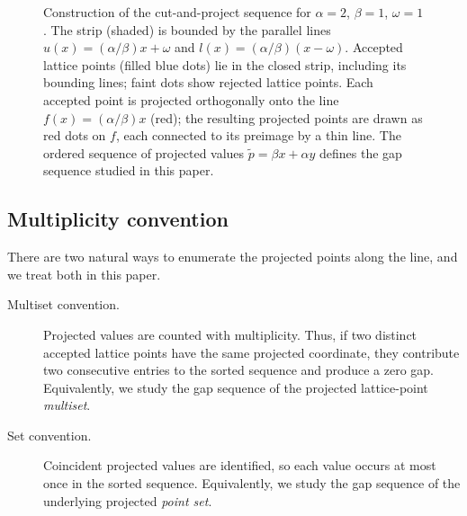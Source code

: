 \documentclass[11pt,reqno]{amsart}
\theoremstyle{plain}
\theoremstyle{definition}
\theoremstyle{remark}
\begin{document}
\begin{figure}[ht]
\begin{tikzpicture}[>=stealth, scale=0.78]
\end{tikzpicture}
\caption{Construction of the cut-and-project sequence for
  \(\alpha=2\), \(\beta=1\), \(\omega=1\).
  The strip (shaded) is bounded by the parallel lines
  \(u(x)=(\alpha/\beta)x+\omega\) and \(l(x)=(\alpha/\beta)(x-\omega)\).
  Accepted lattice points (filled blue dots) lie in the closed strip,
  including its bounding lines; faint dots
  show rejected lattice points.  Each accepted point is projected orthogonally
  onto the line \(f(x)=(\alpha/\beta)x\) (red); the resulting projected points
  are drawn as red dots on \(f\), each connected to its preimage by a thin line.
  The ordered sequence of projected values
  \(\tilde{p}=\beta x+\alpha y\) defines the gap sequence studied in this paper.}
\label{fig:construction}
\end{figure}

\subsection{Multiplicity convention}\label{subsec:multiplicity}

There are two natural ways to enumerate the projected points along the
line, and we treat both in this paper.

\begin{description}
    \item[Multiset convention.]  Projected values are counted with
    multiplicity.  Thus, if two distinct accepted lattice points have the
    same projected coordinate, they contribute two consecutive entries to
    the sorted sequence and produce a zero gap.  Equivalently, we study the
    gap sequence of the projected lattice-point \emph{multiset}.

    \item[Set convention.]  Coincident projected values are identified, so
    each value occurs at most once in the sorted sequence.  Equivalently,
    we study the gap sequence of the underlying projected \emph{point
    set}.
\end{description}
\end{document}
